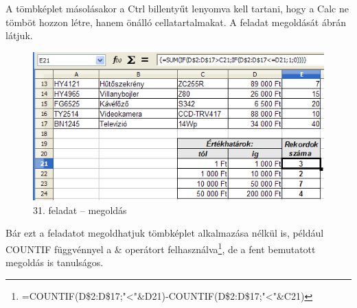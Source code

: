 A tömbképlet másolásakor a Ctrl billentyűt lenyomva kell
tartani, hogy a Calc ne tömböt hozzon létre, hanem önálló
cellatartalmakat. A feladat megoldását 
ábrán látjuk.

\begin{figure}[!h]
\begin{center}
\includegraphics[width=11.834cm]{oocalcv1-img139.png}
\caption{31. feladat -- megoldás}\label{31-feladatMegoldás}
\end{center}
\end{figure}

Bár ezt a feladatot megoldhatjuk tömbképlet
alkalmazása nélkül is, például COUNTIF függvénnyel  a
\& operátort
felhasználva\footnote{=COUNTIF(D\$2:D\$17;"<"\&D21)-COUNTIF(D\$2:D\$17;"<"\&C21)},
de a fent bemutatott megoldás is tanulságos.

